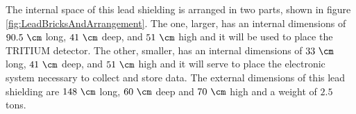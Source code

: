 The internal space of this lead shielding is arranged in two parts, shown in figure \ref{fig:LeadBricksAndArrangement}. The one, larger, has an internal dimensions of $90.5~\cm$ long, $41~\cm$ deep, and $51~\cm$ high and it will be used to place the TRITIUM detector. The other, smaller, has an internal dimensions of $33~\cm$ long, $41~\cm$ deep, and $51~\cm$ high and it will serve to place the electronic system necessary to collect and store data. The external dimensions of this lead shielding are $148~\cm$ long, $60~\cm$ deep and $70~\cm$ high and a weight of $2.5$ tons.

